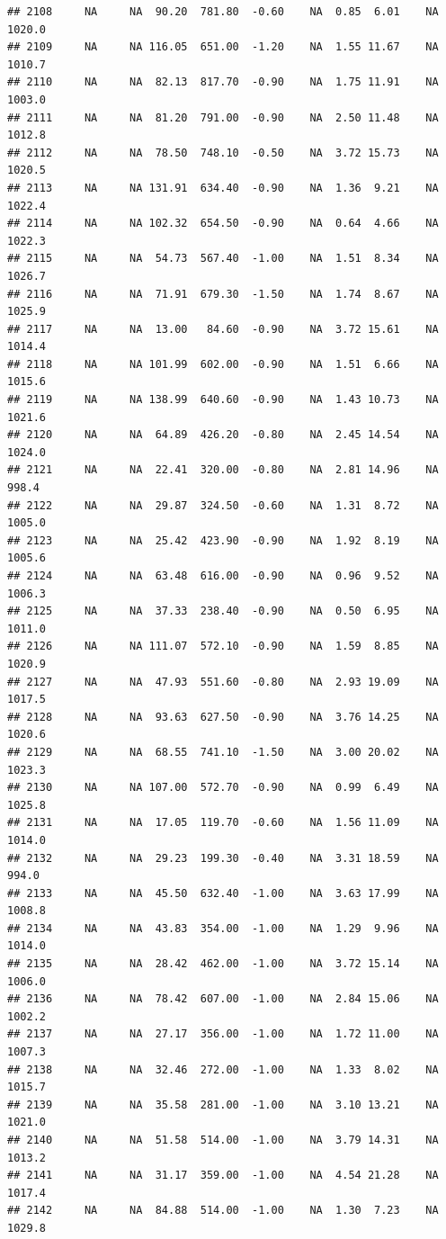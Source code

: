 \documentclass{article}\usepackage{graphicx, color}
\makeatletter
\newenvironment{kframe}{%
 \def\at@end@of@kframe{}%
 \ifinner\ifhmode%
  \def\at@end@of@kframe{\end{minipage}}%
  \begin{minipage}{\columnwidth}%
 \fi\fi%
 \def\FrameCommand##1{\hskip\@totalleftmargin \hskip-\fboxsep
 \colorbox{shadecolor}{##1}\hskip-\fboxsep
     \hskip-\linewidth \hskip-\@totalleftmargin \hskip\columnwidth}%
 \MakeFramed {\advance\hsize-\width
   \@totalleftmargin\z@ \linewidth\hsize
   \@setminipage}}%
 {\par\unskip\endMakeFramed%
 \at@end@of@kframe}
\newenvironment{knitrout}{}{} %
\makeatother
\begin{document}
\begin{knitrout}
\begin{kframe}
\begin{verbatim}
## 2108     NA     NA  90.20  781.80  -0.60    NA  0.85  6.01    NA 1020.0
## 2109     NA     NA 116.05  651.00  -1.20    NA  1.55 11.67    NA 1010.7
## 2110     NA     NA  82.13  817.70  -0.90    NA  1.75 11.91    NA 1003.0
## 2111     NA     NA  81.20  791.00  -0.90    NA  2.50 11.48    NA 1012.8
## 2112     NA     NA  78.50  748.10  -0.50    NA  3.72 15.73    NA 1020.5
## 2113     NA     NA 131.91  634.40  -0.90    NA  1.36  9.21    NA 1022.4
## 2114     NA     NA 102.32  654.50  -0.90    NA  0.64  4.66    NA 1022.3
## 2115     NA     NA  54.73  567.40  -1.00    NA  1.51  8.34    NA 1026.7
## 2116     NA     NA  71.91  679.30  -1.50    NA  1.74  8.67    NA 1025.9
## 2117     NA     NA  13.00   84.60  -0.90    NA  3.72 15.61    NA 1014.4
## 2118     NA     NA 101.99  602.00  -0.90    NA  1.51  6.66    NA 1015.6
## 2119     NA     NA 138.99  640.60  -0.90    NA  1.43 10.73    NA 1021.6
## 2120     NA     NA  64.89  426.20  -0.80    NA  2.45 14.54    NA 1024.0
## 2121     NA     NA  22.41  320.00  -0.80    NA  2.81 14.96    NA  998.4
## 2122     NA     NA  29.87  324.50  -0.60    NA  1.31  8.72    NA 1005.0
## 2123     NA     NA  25.42  423.90  -0.90    NA  1.92  8.19    NA 1005.6
## 2124     NA     NA  63.48  616.00  -0.90    NA  0.96  9.52    NA 1006.3
## 2125     NA     NA  37.33  238.40  -0.90    NA  0.50  6.95    NA 1011.0
## 2126     NA     NA 111.07  572.10  -0.90    NA  1.59  8.85    NA 1020.9
## 2127     NA     NA  47.93  551.60  -0.80    NA  2.93 19.09    NA 1017.5
## 2128     NA     NA  93.63  627.50  -0.90    NA  3.76 14.25    NA 1020.6
## 2129     NA     NA  68.55  741.10  -1.50    NA  3.00 20.02    NA 1023.3
## 2130     NA     NA 107.00  572.70  -0.90    NA  0.99  6.49    NA 1025.8
## 2131     NA     NA  17.05  119.70  -0.60    NA  1.56 11.09    NA 1014.0
## 2132     NA     NA  29.23  199.30  -0.40    NA  3.31 18.59    NA  994.0
## 2133     NA     NA  45.50  632.40  -1.00    NA  3.63 17.99    NA 1008.8
## 2134     NA     NA  43.83  354.00  -1.00    NA  1.29  9.96    NA 1014.0
## 2135     NA     NA  28.42  462.00  -1.00    NA  3.72 15.14    NA 1006.0
## 2136     NA     NA  78.42  607.00  -1.00    NA  2.84 15.06    NA 1002.2
## 2137     NA     NA  27.17  356.00  -1.00    NA  1.72 11.00    NA 1007.3
## 2138     NA     NA  32.46  272.00  -1.00    NA  1.33  8.02    NA 1015.7
## 2139     NA     NA  35.58  281.00  -1.00    NA  3.10 13.21    NA 1021.0
## 2140     NA     NA  51.58  514.00  -1.00    NA  3.79 14.31    NA 1013.2
## 2141     NA     NA  31.17  359.00  -1.00    NA  4.54 21.28    NA 1017.4
## 2142     NA     NA  84.88  514.00  -1.00    NA  1.30  7.23    NA 1029.8

\end{verbatim}
\end{kframe}
\end{knitrout}
\end{document}
